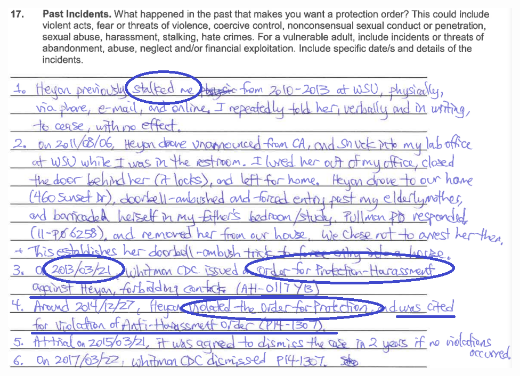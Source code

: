 \documentclass[9pt, b5paper]{article}
\begin{document}
\includegraphics[width=.9\linewidth]{./pic/dearCousin_20220919_183625.png}
\end{document}

